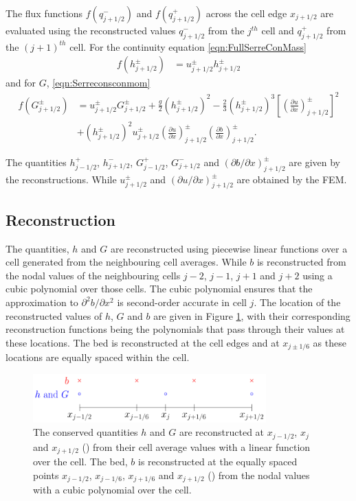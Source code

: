 \documentclass[times]{elsarticle}
\DeclareRobustCommand{\circlet}[1]{\tikz{\draw[#1,thick] (0,0) circle [radius=0.1cm];}}
\DeclareRobustCommand{\crosst}[1]{\tikz{\draw[#1,thick] (0cm,0cm) --
  		(0.1cm,0.1cm) -- (0cm,0.2cm) -- (0.1cm,0.1cm) -- (0.2cm,0.2cm) -- (0.1cm,0.1cm)-- (0.2cm,0cm);}}
\begin{document}
The flux functions $f(q^-_{j+1/2})$ and $f(q^+_{j+1/2})$ across the cell edge $x_{j+1/2}$ are evaluated using the reconstructed values $q^-_{j+1/2}$ from the $j^{th}$ cell and $q^+_{j+1/2}$ from the $(j+1)^{th}$ cell. For the continuity equation \eqref{eqn:FullSerreConMass}
\begin{align}
f\left(h^\pm_{j+1/2}\right) &= u^\pm_{j + 1/2}  {h}^\pm_{j + 1/2}
\label{eqn:FluxMassNum}
\end{align}
and for $G$, \eqref{eqn:Serreconsconmom}
\begin{align}
f\left(G^\pm_{j+1/2}\right) &=  u^\pm_{j + 1/2} G^\pm_{j + 1/2}  + \frac{g}{2}\left({h}^\pm_{j + 1/2} \right)^2 - \frac{2}{3}\left({h}^\pm_{j + 1/2}\right)^3 \left[\left(\frac{\partial {u}}{\partial x} \right)^\pm_{j + 1/2} \right]^2 \nonumber\\ &+ \left({h}^\pm_{j + 1/2}\right)^2 u^\pm_{j + 1/2} \left(\frac{\partial {u}}{\partial x} \right)^\pm_{j + 1/2} \left(\frac{\partial b}{\partial x} \right)^\pm_{j + 1/2} .
\label{eqn:FluxIrrotNum}
\end{align}

The quantities ${h}^+_{j - 1/2}$, ${h}^-_{j + 1/2}$, $G^+_{j - 1/2}$, $G^-_{j + 1/2}$ and $ \left({\partial {b}}/{\partial x} \right)^\pm_{j + 1/2}$ are given by the reconstructions. While $u^\pm_{j+1/2}$ and $ \left({\partial {u}}/{\partial x} \right)^\pm_{j + 1/2}$ are obtained by the FEM.

\subsection{Reconstruction}
The quantities, $h$ and $G$ are reconstructed using piecewise linear functions over a cell generated from the neighbouring cell averages. While $b$ is reconstructed from the nodal values of the neighbouring cells $j-2$, $j-1$, $j+1$ and $j+2$ using a cubic polynomial over those cells. The cubic polynomial ensures that the approximation to $\partial^2 b / \partial x^2$ is second-order accurate in cell $j$. The location of the reconstructed values of $h$, $G$ and $b$ are given in Figure \ref{fig:ReconLocs}, with their corresponding reconstruction functions being the polynomials that pass through their values at these locations. The bed is reconstructed at the cell edges and at $x_{j\pm1/6}$ as these locations are equally spaced within the cell.

\begin{figure}
	\centering
	\includegraphics[width=0.8\textwidth]{./Figures/Diagrams/FEMbasis/Reconstruction/FEVMRecon.pdf}
	\caption{The conserved quantities $h$ and $G$ are reconstructed at $x_{j-1/2}$, $x_j$ and $x_{j+1/2}$ (\circlet{blue}) from their cell average values with a linear function over the cell. The bed, $b$ is reconstructed at the equally spaced points $x_{j-1/2}$, $x_{j-1/6}$, $x_{j+1/6}$ and $x_{j+1/2}$ (\crosst{red}) from the nodal values with a cubic polynomial over the cell.}
	\label{fig:ReconLocs}
\end{figure} 
\end{document}
